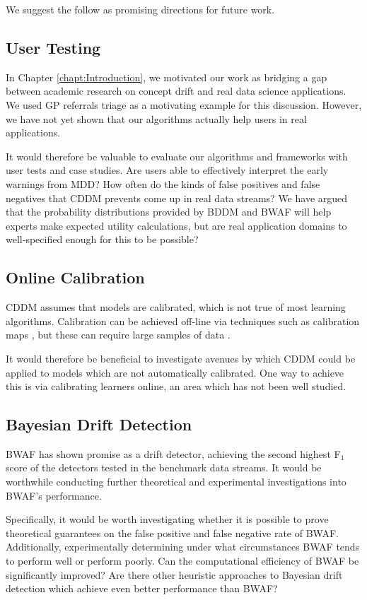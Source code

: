 We suggest the follow as promising directions for future work.

\subsection{User Testing}

In Chapter \ref{chapt:Introduction}, we motivated our work as bridging a gap between academic research on concept drift and real data science applications. We used GP referrals triage as a motivating example for this discussion. However, we have not yet shown that our algorithms actually help users in real applications.

It would therefore be valuable to evaluate our algorithms and frameworks with user tests and case studies. Are users able to effectively interpret the early warnings from MDD? How often do the kinds of false positives and false negatives that CDDM prevents come up in real data streams? We have argued that the probability distributions provided by BDDM and BWAF will help experts make expected utility calculations, but are real application domains to well-specified enough for this to be possible?

\subsection{Online Calibration}

CDDM assumes that models are calibrated, which is not true of most learning algorithms. Calibration can be achieved off-line via techniques such as calibration maps \cite{beyond_sigmoids}\cite{calibrating}, but these can require large samples of data \cite{beyond_sigmoids}. 

It would therefore be beneficial to investigate avenues by which CDDM could be applied to models which are not automatically calibrated. One way to achieve this is via calibrating learners online, an area which has not been well studied. 

\subsection{Bayesian Drift Detection}

BWAF has shown promise as a drift detector, achieving the second highest F$_1$ score of the detectors tested in the benchmark data streams. It would be worthwhile conducting further theoretical and experimental investigations into BWAF's performance. 

Specifically, it would be worth investigating whether it is possible to prove theoretical guarantees on the false positive and false negative rate of BWAF. Additionally, experimentally determining under what circumstances BWAF tends to perform well or perform poorly. Can the computational efficiency of BWAF be significantly improved? Are there other heuristic approaches to Bayesian drift detection which achieve even better performance than BWAF?